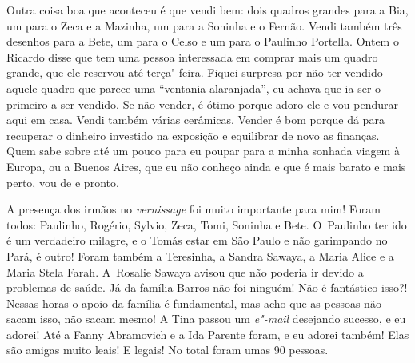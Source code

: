 Outra coisa boa que aconteceu é que vendi bem: dois quadros grandes para
a Bia, um para o Zeca e a Mazinha, um para a Soninha e o Fernão. Vendi
também três desenhos para a Bete, um para o Celso e um para o Paulinho
Portella. Ontem o Ricardo disse que tem uma pessoa interessada em
comprar mais um quadro grande, que ele reservou até terça"-feira. Fiquei
surpresa por não ter vendido aquele quadro que parece uma ``ventania
alaranjada'', eu achava que ia ser o primeiro a ser vendido. Se não
vender, é ótimo porque adoro ele e vou pendurar aqui em casa. Vendi
também várias cerâmicas. Vender é bom porque dá para recuperar o
dinheiro investido na exposição e equilibrar de novo as finanças. Quem
sabe sobre até um pouco para eu poupar para a minha sonhada viagem à
Europa, ou a Buenos Aires, que eu não conheço ainda e que é mais barato
e mais perto, vou de  e pronto.

A presença dos irmãos no \emph{vernissage} foi muito importante para
mim! Foram todos: Paulinho, Rogério, Sylvio, Zeca, Tomi, Soninha e Bete.
O~Paulinho ter ido é um verdadeiro milagre, e o Tomás estar em São Paulo
e não garimpando no Pará, é outro! Foram também a Teresinha, a Sandra
Sawaya, a Maria Alice e a Maria Stela Farah. A~Rosalie Sawaya avisou que
não poderia ir devido a problemas de saúde. Já da família Barros não foi
ninguém! Não é fantástico isso?! Nessas horas o apoio da família é
fundamental, mas acho que as pessoas não sacam isso, não sacam mesmo! A
Tina passou um \emph{e"-mail} desejando sucesso, e eu adorei! Até a Fanny
Abramovich e a Ida Parente foram, e eu adorei também! Elas são amigas
muito leais! E legais! No total foram umas 90 pessoas.

